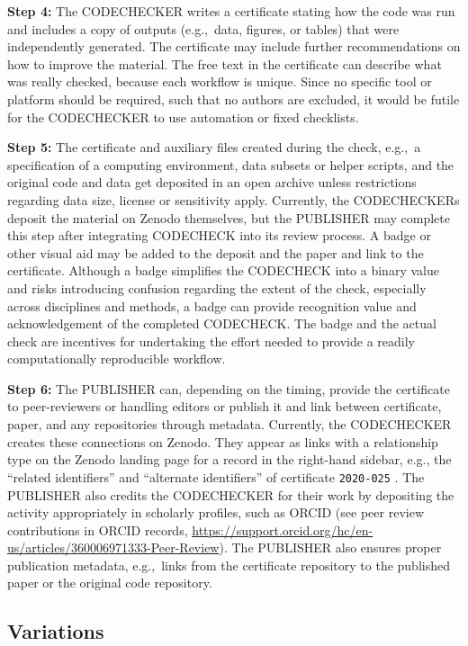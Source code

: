 \documentclass[12pt]{article}
\begin{document}
\textbf{Step 4:} The CODECHECKER writes a certificate stating how the
code was run and includes a copy of outputs (e.g.,~data, figures, or
tables) that were independently generated.  The certificate may
include further recommendations on how to improve the material.  The
free text in the certificate can describe what was really checked,
because each workflow is unique.  Since no specific tool or platform
should be required, such that no authors are excluded, it would be
futile for the CODECHECKER to use automation or fixed checklists.

\textbf{Step 5:} The certificate and auxiliary files created
during the check, e.g.,~a specification of a computing environment, data 
subsets or helper scripts, and the original code and data get deposited in
an open archive unless restrictions regarding data size, license or 
sensitivity apply.
Currently, the CODECHECKERs deposit the material on Zenodo themselves, but the PUBLISHER may complete this step after integrating CODECHECK into its review process.
A badge or other visual aid may be added to the deposit and the paper and
link to the certificate.
Although a badge simplifies the CODECHECK into a binary value and risks introducing confusion regarding the extent of the check, especially across disciplines and methods, a badge can provide recognition value and acknowledgement of the completed CODECHECK.
The badge and the actual check are incentives for undertaking the effort needed to provide a readily computationally reproducible workflow.

\textbf{Step 6:} The PUBLISHER can, depending on the timing, provide the
certificate to peer-reviewers or handling editors or publish it
and link between  certificate, paper, and any repositories 
through metadata. Currently, the CODECHECKER creates these connections on
Zenodo. They appear as links with a relationship type on the Zenodo
landing page for a record in the right-hand sidebar, e.g., the 
``related identifiers'' and ``alternate identifiers'' 
of certificate \texttt{2020-025} \cite{cert-2020-025}.
The PUBLISHER also credits the CODECHECKER for their work by depositing
the activity appropriately in scholarly profiles, such as ORCID
(see peer review contributions in ORCID records,
\url{https://support.orcid.org/hc/en-us/articles/360006971333-Peer-Review}).
The PUBLISHER also ensures proper publication metadata, e.g.,~links from the 
certificate repository to the published paper or the original code repository.

\subsection*{Variations}\label{variations}
\end{document}
